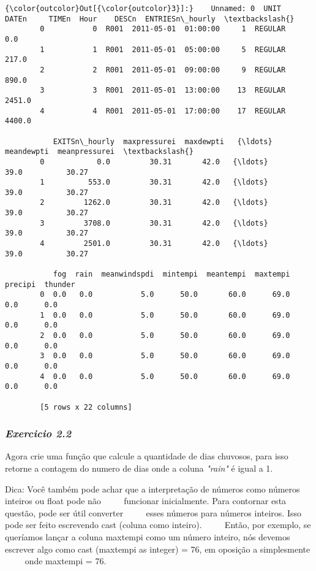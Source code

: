 \documentclass[11pt]{article}
\begin{document}
\begin{Verbatim}[commandchars=\\\{\}]
{\color{outcolor}Out[{\color{outcolor}3}]:}    Unnamed: 0  UNIT       DATEn     TIMEn  Hour    DESCn  ENTRIESn\_hourly  \textbackslash{}
        0           0  R001  2011-05-01  01:00:00     1  REGULAR              0.0   
        1           1  R001  2011-05-01  05:00:00     5  REGULAR            217.0   
        2           2  R001  2011-05-01  09:00:00     9  REGULAR            890.0   
        3           3  R001  2011-05-01  13:00:00    13  REGULAR           2451.0   
        4           4  R001  2011-05-01  17:00:00    17  REGULAR           4400.0   
        
           EXITSn\_hourly  maxpressurei  maxdewpti   {\ldots}     meandewpti  meanpressurei  \textbackslash{}
        0            0.0         30.31       42.0   {\ldots}           39.0          30.27   
        1          553.0         30.31       42.0   {\ldots}           39.0          30.27   
        2         1262.0         30.31       42.0   {\ldots}           39.0          30.27   
        3         3708.0         30.31       42.0   {\ldots}           39.0          30.27   
        4         2501.0         30.31       42.0   {\ldots}           39.0          30.27   
        
           fog  rain  meanwindspdi  mintempi  meantempi  maxtempi  precipi  thunder  
        0  0.0   0.0           5.0      50.0       60.0      69.0      0.0      0.0  
        1  0.0   0.0           5.0      50.0       60.0      69.0      0.0      0.0  
        2  0.0   0.0           5.0      50.0       60.0      69.0      0.0      0.0  
        3  0.0   0.0           5.0      50.0       60.0      69.0      0.0      0.0  
        4  0.0   0.0           5.0      50.0       60.0      69.0      0.0      0.0  
        
        [5 rows x 22 columns]
\end{Verbatim}
            
    \subsubsection{\texorpdfstring{\emph{Exercicio
2.2}}{Exercicio 2.2}}\label{exercicio-2.2}

Agora crie uma função que calcule a quantidade de dias chuvosos, para
isso retorne a contagem do numero de dias onde a coluna \emph{"rain"} é
igual a 1.

Dica: Você também pode achar que a interpretação de números como números
inteiros ou float pode não ~~~~ funcionar inicialmente. Para contornar
esta questão, pode ser útil converter ~~~~ esses números para números
inteiros. Isso pode ser feito escrevendo cast (coluna como inteiro).
~~~~ Então, por exemplo, se queríamos lançar a coluna maxtempi como um
número inteiro, nós devemos ~~~~ escrever algo como cast (maxtempi as
integer) = 76, em oposição a simplesmente ~~~~ onde maxtempi = 76.
\end{document}
